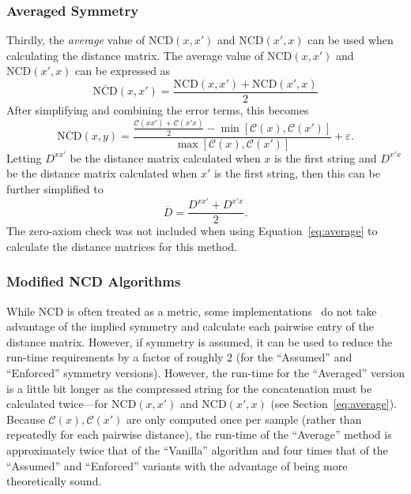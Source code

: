 \documentclass[preprint,12pt]{article}
\begin{document}
\subsubsection{Averaged Symmetry}

Thirdly, the \textit{average} value of $\text{NCD}(x,x')$ and $\text{NCD}(x',x)$ can be used when calculating the distance matrix.
The average value of $\text{NCD}(x,x')$ and $\text{NCD}(x',x)$ can be expressed as
$$
    \overline{\text{NCD}}(x,x') = \frac{\text{NCD}(x,x') + \text{NCD}(x', x)}{2}
$$
After simplifying and combining the error terms, this becomes
\begin{equation}
    \overline{\text{NCD}}(x, y) = \frac{\frac{\mathcal{C}(xx') + \mathcal{C}(x'x)}{2} - \min[\mathcal{C}(x), \mathcal{C}(x')]}{\max[\mathcal{C}(x), \mathcal{C}(x')]} + \varepsilon.
\end{equation}
Letting $D^{xx'}$ be the distance matrix calculated when $x$ is the first string and $D^{x'x}$ be the distance matrix calculated when $x'$ is the first string, then this can be further simplified to
\begin{equation}
    \overline{D} = \frac{D^{xx'}  + D^{x'x}}{2}.
    \label{eq:average}
\end{equation}
The zero-axiom check was not included when using Equation~\ref{eq:average} to calculate the distance matrices for this method.



\subsubsection{Modified NCD Algorithms}

While NCD is often treated as a metric, some implementations~\cite{jiang2022less} do not take advantage of the implied symmetry and calculate each pairwise entry of the distance matrix.
However, if symmetry is assumed, it can be used to reduce the run-time requirements by a factor of roughly 2 (for the ``Assumed'' and ``Enforced'' symmetry versions).
However, the run-time for the ``Averaged'' version is a little bit longer as the compressed string for the concatenation must be calculated twice---for $\text{NCD}(x,x')$ and $\text{NCD}(x',x)$ (see Section~\ref{eq:average}).
Because $\mathcal{C}(x), \mathcal{C}(x')$ are only computed once per sample (rather than repeatedly for each pairwise distance), the run-time of the ``Average'' method is approximately twice that of the ``Vanilla'' algorithm and four times that of the ``Assumed'' and ``Enforced'' variants with the advantage of being more theoretically sound.
\end{document}
